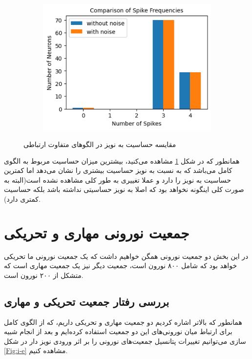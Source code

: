 \documentclass[12pt]{article}
\begin{document}
\begin{figure}[H]
\begin{subfigure}[b]{0.3\textwidth}
    \includegraphics[width=\textwidth]{Figs/fixed_count.png}
    \caption{}
  \end{subfigure}
  \caption{مقایسه حساسیت به نویز در الگوهای متفاوت ارتباطی}
  \label{Fig:compare}
\end{figure}


همانطور که در شکل \ref{Fig:compare} مشاهده می‌کنید، بیشترین میزان حساسیت مربوط به الگوی کامل می‌‌باشد که به نسبت به نویز حساسیت بیشتری را نشان می‌دهد اما  کمترین حساسیت به نویز را دارد و عملا تغییری به طور کلی مشاهده نشده است(البته به صورت کلی اینگونه نخواهد بود که اصلا به نویز حساسیتی نداشته باشد بلکه حساسیت کمتری دارد).

	\section{جمعیت نورونی مهاری و تحریکی}
	در این بخش دو جمعیت نورونی همگن خواهیم داشت که یک جمعیت نورونی ما تحریکی خواهد بود که شامل ۸۰۰ نورون  است، جمعیت دیگر نیز یک جمعیت مهاری است که متشکل از ۲۰۰ نورون  است.

	
	\subsection{ بررسی رفتار جمعیت تحریکی و مهاری}	
همانطور که بالاتر اشاره کردیم دو جمعیت مهاری و تحریکی داریم، که از الگوی کامل برای ارتباط میان نورونی‌های این دو جمعیت استفاده کرده‌ایم و بعد از انجام شبیه سازی می‌توانیم تغییرات پتانسیل جمعیت‌های نورونی را بر اثر ورودی نویز دار در شکل \ref{Fig:i-e} مشاهده کنیم.
\end{document}
